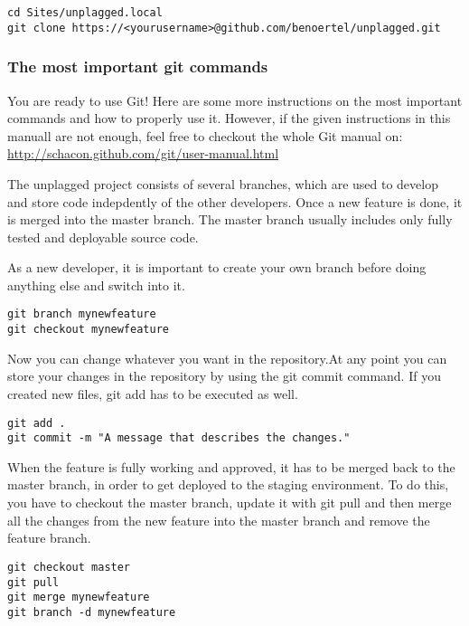 \begin{lstlisting}[caption=Cloning a repository]
cd Sites/unplagged.local
git clone https://<yourusername>@github.com/benoertel/unplagged.git
\end{lstlisting}

\subsubsection{The most important git commands}

You are ready to use Git! Here are some more instructions on the most important commands and how to properly use it. 
However, if the given instructions in this manuall are not enough, feel free to checkout the whole Git manual on: 
\url{http://schacon.github.com/git/user-manual.html}

The unplagged project consists of several branches, which are used to develop and store code indepdently of the other 
developers. Once a new feature is done, it is merged into the master branch. The master branch usually includes only 
fully tested and deployable source code. 

As a new developer, it is important to create your own branch before doing anything else and switch into it.

\begin{lstlisting}[caption=Creating branches]
git branch mynewfeature
git checkout mynewfeature
\end{lstlisting}

Now you can change whatever you want in the repository.At any point you can store your changes in the repository by using the git commit command. If you created new files, git add has to be executed as well.

\begin{lstlisting}[caption=Creating branches]
git add .
git commit -m "A message that describes the changes."
\end{lstlisting}

When the feature is fully working and approved, it has to be merged back to the master branch, in order to get deployed 
to the staging environment. To do this, you have to checkout the master branch, update it with git pull and then merge 
all the changes from the new feature into the master branch and remove the feature branch.

\begin{lstlisting}[caption=Creating branches]
git checkout master
git pull
git merge mynewfeature
git branch -d mynewfeature
\end{lstlisting}

